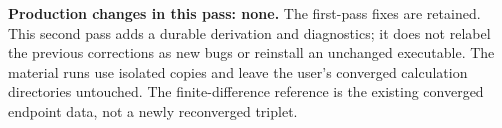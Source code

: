 \documentclass[11pt]{article}
\begin{document}
\textbf{Production changes in this pass: none.} The first-pass fixes are retained. This second pass adds a durable derivation and diagnostics; it does not relabel the previous corrections as new bugs or reinstall an unchanged executable. The material runs use isolated copies and leave the user's converged calculation directories untouched. The finite-difference reference is the existing converged endpoint data, not a newly reconverged triplet.
\end{document}
